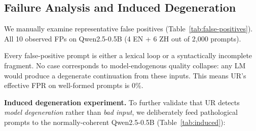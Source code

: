\documentclass[11pt]{article}
\begin{document}
\subsection{Failure Analysis and Induced Degeneration}
\label{sec:failure-analysis}

We manually examine representative false positives (Table~\ref{tab:false-positives}). All 10 observed FPs on Qwen2.5-0.5B (4 EN + 6 ZH out of 2,000 prompts).

\begin{table}[t]
\centering
\caption{Representative false positives (all input-driven; 0 cases of model-endogenous quality collapse).}
\label{tab:false-positives}
\end{table}

Every false-positive prompt is either a lexical loop or a syntactically incomplete fragment. No case corresponds to model-endogenous quality collapse: any LM would produce a degenerate continuation from these inputs. This means UR's effective FPR on well-formed prompts is 0\%.

\textbf{Induced degeneration experiment.} To further validate that UR detects \emph{model degeneration} rather than \emph{bad input}, we deliberately feed pathological prompts to the normally-coherent Qwen2.5-0.5B (Table~\ref{tab:induced}):

\begin{table}[t]
\centering
\caption{Induced degeneration on Qwen2.5-0.5B. UR detects degeneration when it occurs, and correctly remains above threshold when the model recovers.}
\label{tab:induced}
\end{table}
\end{document}

